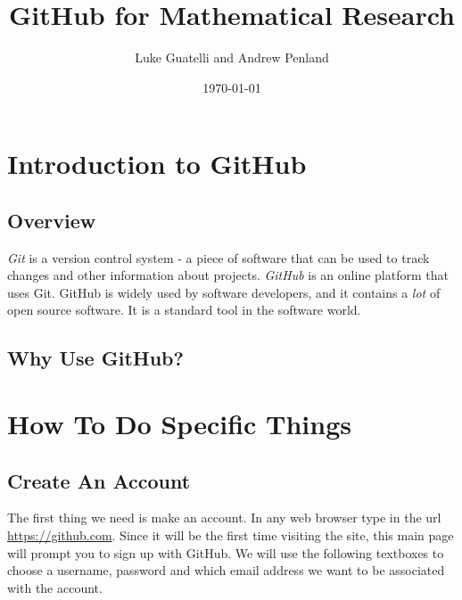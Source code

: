\documentclass[11pt]{article}
\title{GitHub for Mathematical Research}
\author{Luke Guatelli and Andrew Penland}
\date{\today}
\begin{document}
\maketitle

\section{Introduction to GitHub}

\subsection{Overview}

\textit{Git} is a version control system - a piece of software that can be used to track changes and other information about projects. \textit{GitHub} is an online platform that uses Git. GitHub is widely used by software developers, and it contains a \textit{lot} of open source software. It is a standard tool in the software world. 

\subsection{Why Use GitHub?}

\section{How To Do Specific Things}
\newpage
\subsection{Create An Account}

The first thing we need is make an account. In any web browser type in the url \url{https://github.com}. Since it will be the first time visiting the site, this main page will prompt you to sign up with GitHub. We will use the following textboxes to choose a username, password and which email address we want to be associated with the account.
\end{document}
